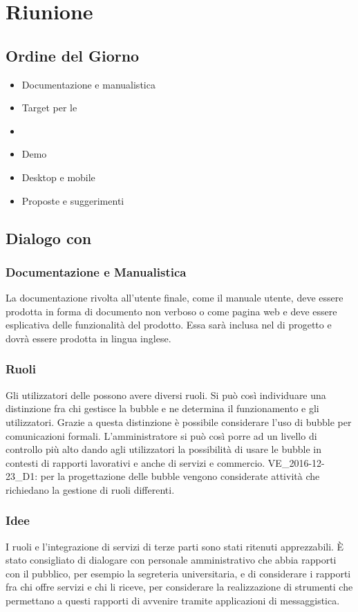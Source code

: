 \section{Riunione}
\subsection{Ordine del Giorno}
\begin{itemize}
	\item Documentazione e manualistica
	\item Target per le 
	\item {}
	\item Demo
	\item Desktop e mobile
	\item Proposte e suggerimenti
\end{itemize}

\subsection{Dialogo con \Proponente}
\subsubsection{Documentazione e Manualistica}
La documentazione rivolta all'utente finale, come il manuale utente, deve  essere prodotta in forma di documento non verboso o come pagina web e deve essere esplicativa delle funzionalità del prodotto. 
Essa sarà inclusa nel  di progetto e dovrà essere prodotta in lingua inglese.

\subsubsection{Ruoli}
Gli utilizzatori delle  possono avere diversi ruoli. Si può così individuare una distinzione fra chi gestisce la bubble e ne determina il funzionamento e gli utilizzatori.
Grazie a questa distinzione è possibile considerare l'uso di bubble per comunicazioni formali. 
L'amministratore si può così porre ad un livello di controllo più alto dando agli utilizzatori la possibilità di usare le bubble in contesti di rapporti lavorativi e anche di servizi e commercio.
VE\_2016-12-23\_D1: per la progettazione delle bubble vengono considerate attività che richiedano la gestione di ruoli differenti.

\subsubsection{Idee}
I ruoli e l'integrazione di servizi di terze parti sono stati ritenuti apprezzabili.
\`{E} stato consigliato di dialogare con personale amministrativo che abbia rapporti con il pubblico, per esempio la segreteria universitaria, e di considerare i rapporti fra chi offre servizi e chi li riceve, per considerare la realizzazione di strumenti che permettano a questi rapporti di avvenire tramite applicazioni di messaggistica.  

